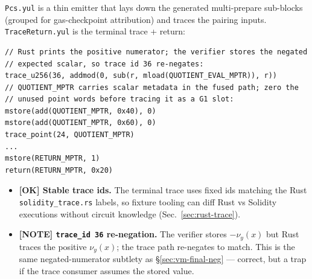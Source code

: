 \texttt{Pcs.yul} is a thin emitter that lays down the generated
multi-prepare sub-blocks (grouped for gas-checkpoint attribution) and
traces the pairing inputs. \texttt{TraceReturn.yul} is the terminal
trace + return:
\begin{lstlisting}[style=yul]
// Rust prints the positive numerator; the verifier stores the negated
// expected scalar, so trace id 36 re-negates:
trace_u256(36, addmod(0, sub(r, mload(QUOTIENT_EVAL_MPTR)), r))
// QUOTIENT_MPTR carries scalar metadata in the fused path; zero the
// unused point words before tracing it as a G1 slot:
mstore(add(QUOTIENT_MPTR, 0x40), 0)
mstore(add(QUOTIENT_MPTR, 0x60), 0)
trace_point(24, QUOTIENT_MPTR)
...
mstore(RETURN_MPTR, 1)
return(RETURN_MPTR, 0x20)
\end{lstlisting}
\begin{itemize}
  \item \textcolor{tracegreen}{\textbf{[OK] Stable trace ids.}} The
        terminal trace uses fixed ids matching the Rust
        \texttt{solidity\_\allowbreak{}trace.rs} labels, so fixture tooling can diff
        Rust vs Solidity executions without circuit knowledge
        (Sec.~\ref{sec:rust-trace}).
  \item \textcolor{mathpurple}{\textbf{[NOTE] \texttt{trace\_id 36}
        re-negation.}} The verifier stores $-\nu_y(x)$ but Rust traces
        the positive $\nu_y(x)$; the trace path re-negates to match.
        This is the same negated-numerator subtlety as
        \S\ref{sec:vm-final-neg} --- correct, but a trap if the trace
        consumer assumes the stored value.
\end{itemize}
